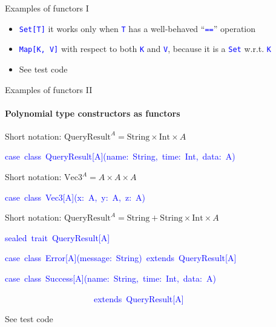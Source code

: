 \documentclass[english]{beamer}
\newenvironment{lyxcode}
   {\par\begin{list}{}{
     \setlength{\rightmargin}{\leftmargin}
     \setlength{\listparindent}{0pt}%
     \raggedright
     \setlength{\itemsep}{0pt}
     \setlength{\parsep}{0pt}
     \normalfont\ttfamily}%
    \def\{{\char`\{}
    \def\}{\char`\}}
    \def\textasciitilde{\char`\~}
    \item[]}
   {\end{list}}
\begin{document}
\begin{frame}{Examples of functors I}
\begin{itemize}
\item \texttt{\textcolor{blue}{\footnotesize{}Set{[}T{]}}} \textendash{}
it works only when \texttt{\textcolor{blue}{\footnotesize{}T}} has
a well-behaved ``\texttt{\textcolor{blue}{\footnotesize{}==}}''
operation
\item \texttt{\textcolor{blue}{\footnotesize{}Map{[}K, V{]}}} with respect
to both \texttt{\textcolor{blue}{\footnotesize{}K}} and \texttt{\textcolor{blue}{\footnotesize{}V}},
because it is a \texttt{\textcolor{blue}{\footnotesize{}Set}} w.r.t.
\texttt{\textcolor{blue}{\footnotesize{}K}}{\footnotesize \par}
\item See test code
\end{itemize}
\end{frame}

\begin{frame}{Examples of functors II}


\framesubtitle{Polynomial type constructors as functors}
\begin{enumerate}
\item Short notation: $\text{QueryResult}^{A}=\text{String}\times\text{Int}\times A$
\begin{lyxcode}
\textcolor{blue}{\footnotesize{}case~class~QueryResult{[}A{]}(name:~String,~time:~Int,~data:~A)}{\footnotesize \par}
\end{lyxcode}
\item Short notation: $\text{Vec3}^{A}=A\times A\times A$
\begin{lyxcode}
\textcolor{blue}{\footnotesize{}case~class~Vec3{[}A{]}(x:~A,~y:~A,~z:~A)}{\footnotesize \par}
\end{lyxcode}
\item Short notation: $\text{QueryResult}^{A}=\text{String}+\text{String}\times\text{Int}\times A$
\begin{lyxcode}
\textcolor{blue}{\footnotesize{}sealed~trait~QueryResult{[}A{]}}{\footnotesize \par}

\textcolor{blue}{\footnotesize{}case~class~Error{[}A{]}(message:~String)~extends~QueryResult{[}A{]}}{\footnotesize \par}

\textcolor{blue}{\footnotesize{}case~class~Success{[}A{]}(name:~String,~time:~Int,~data:~A)~}{\footnotesize \par}

\textcolor{blue}{\footnotesize{}~~~~~~~~~~~~~~~~~~~~~extends~QueryResult{[}A{]}}{\footnotesize \par}
\end{lyxcode}
\end{enumerate}
See test code
\end{frame}
\end{document}
